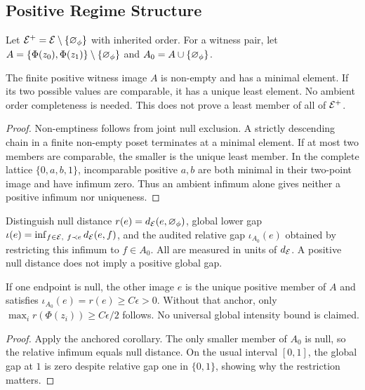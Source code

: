 \subsection{Positive Regime Structure}
\begin{definition}\label{def:positive-regime-space}
Let $\mathcal{E}^+=\mathcal{E}\setminus\{\varnothing_\phi\}$ with inherited order. For a witness pair, let $A=\{\Phi(z_0),\Phi(z_1)\}\setminus\{\varnothing_\phi\}$ and $A_0=A\cup\{\varnothing_\phi\}$.
\end{definition}

\begin{theorem}\label{thm:minimal-positive-regime}
The finite positive witness image $A$ is non-empty and has a minimal element. If its two possible values are comparable, it has a unique least element. No ambient order completeness is needed. This does not prove a least member of all of $\mathcal{E}^+$.
\end{theorem}
\begin{proof}
Non-emptiness follows from joint null exclusion. A strictly descending chain in a finite non-empty poset terminates at a minimal element. If at most two members are comparable, the smaller is the unique least member. In the complete lattice $\{0,a,b,1\}$, incomparable positive $a,b$ are both minimal in their two-point image and have infimum zero. Thus an ambient infimum alone gives neither a positive infimum nor uniqueness.
\end{proof}

\begin{definition}\label{def:structural-intensity}
Distinguish null distance $r(e)=d_{\mathcal{E}}(e,\varnothing_\phi)$, global lower gap $\iota(e)=\inf_{f\in\mathcal{E},\ f\prec e}d_{\mathcal{E}}(e,f)$, and the audited relative gap $\iota_{A_0}(e)$ obtained by restricting this infimum to $f\in A_0$. All are measured in units of $d_{\mathcal{E}}$. A positive null distance does not imply a positive global gap.
\end{definition}

\begin{theorem}\label{thm:universal-intensity-bound}
If one endpoint is null, the other image $e$ is the unique positive member of $A$ and satisfies $\iota_{A_0}(e)=r(e)\geq C\epsilon>0$. Without that anchor, only $\max_i r(\Phi(z_i))\geq C\epsilon/2$ follows. No universal global intensity bound is claimed.
\end{theorem}
\begin{proof}
Apply the anchored corollary. The only smaller member of $A_0$ is null, so the relative infimum equals null distance. On the usual interval $[0,1]$, the global gap at $1$ is zero despite relative gap one in $\{0,1\}$, showing why the restriction matters.
\end{proof}

